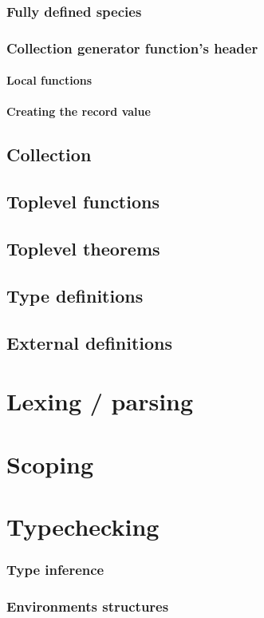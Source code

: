 \documentclass{book}
\begin{document}
\subsection{Fully defined species}
\subsection{Collection generator function's header}
\subsubsection{Local functions}
\subsubsection{Creating the record value}
\section{Collection}
\section{Toplevel functions}
\section{Toplevel theorems}
\section{Type definitions}
\section{External definitions}

\chapter{Lexing / parsing}
\chapter{Scoping}

\chapter{Typechecking}
\subsection{Type inference}
\subsection{Environments structures}
\end{document}
